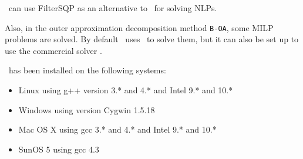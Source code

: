 \Bonmin\ can use FilterSQP \cite{FilTer} as an alternative to \Ipopt\ for solving NLPs.

Also, in the outer approximation decomposition method {\tt B-OA}, some MILP problems are
solved. By default \Bonmin\ uses  \Cbc\ to solve them, but it can also be set up to use
the commercial solver .

\Bonmin\ has been installed on the following systems:
\begin{itemize}
\item Linux using g++ version 3.* and 4.* and Intel 9.* and 10.*
\item Windows using version Cygwin 1.5.18
\item Mac OS X using gcc 3.* and 4.* and Intel 9.* and 10.*
\item SunOS 5 using gcc 4.3
\end{itemize}

